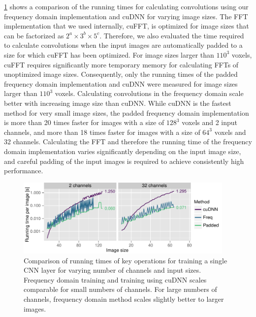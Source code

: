 \ref{fig:imagesize} shows a comparison of the running times for calculating
convolutions using our frequency domain implementation and cuDNN for varying
image sizes. The FFT implementation that we used internally, cuFFT, is optimized
for image sizes that can be factorized as $2^a\times3^b\times5^c$. Therefore, we
also evaluated the time required to calculate convolutions when the input images
are automatically padded to a size for which cuFFT has been optimized. For image
sizes larger than $110^3$ voxels, cuFFT requires significantly more temporary
memory for calculating FFTs of unoptimized image sizes. Consequently, only the
running times of the padded frequency domain implementation and cuDNN were
measured for image sizes larger than $110^3$ voxels. Calculating convolutions in
the frequency domain scale better with increasing image size than cuDNN. While
cuDNN is the fastest method for very small image sizes, the padded frequency
domain implementation is more than 20 times faster for images with a size of
$128^3$ voxels and 2 input channels, and more than 18 times faster for images
with a size of $64^3$ voxels and 32 channels. Calculating the FFT and therefore
the running time of the frequency domain implementation varies significantly
depending on the input image size, and careful padding of the input images is
required to achieve consistently high performance.


\begin{figure}
\centering
\includegraphics[width=0.95\textwidth]{figures/imagesize}
\caption[Comparison of running times of key operations for training a single
CNN layer.]{Comparison of running times of key operations for training a single
CNN layer for varying number of channels and input sizes. Frequency domain
training and training using cuDNN scales comparable for small numbers of
channels. For large numbers of channels, frequency domain method scales
slightly better to larger images.}
\label{fig:imagesize}
\end{figure}


